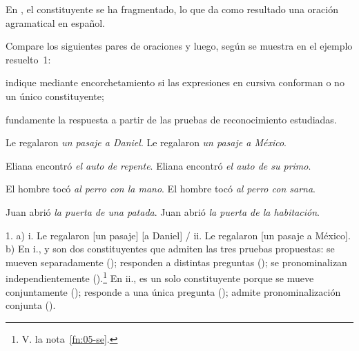 \begin{exe}
\end{exe}

En , el constituyente 
se ha fragmentado, lo que da como resultado una oración agramatical en español.

\begin{ejercicio}\label{ej:05-pares}
Compare los siguientes pares de oraciones y luego, según se muestra en el
ejemplo resuelto~1:

\begin{consignas}
  \item indique mediante encorchetamiento si las expresiones en cursiva
        conforman o no un único constituyente;
  \item fundamente la respuesta a partir de las pruebas de reconocimiento
        estudiadas.
\end{consignas}

\begin{exe}
  \ex
    \begin{xlist}
      \ex Le regalaron \textit{un pasaje a Daniel}.
      \ex Le regalaron \textit{un pasaje a México}.
    \end{xlist}
  \ex
    \begin{xlist}
      \ex Eliana encontró \textit{el auto de repente}.
      \ex Eliana encontró \textit{el auto de su primo}.
    \end{xlist}
  \ex
    \begin{xlist}
      \ex El hombre tocó \textit{al perro con la mano}.
      \ex El hombre tocó \textit{al perro con sarna}.
    \end{xlist}
  \ex
    \begin{xlist}
      \ex Juan abrió \textit{la puerta de una patada}.
      \ex Juan abrió \textit{la puerta de la habitación}.
    \end{xlist}
\end{exe}

\begin{resuelto}
1. a) i. Le regalaron [un pasaje] [a Daniel] / ii. Le regalaron [un pasaje a
México]. b) En i.,  y  son dos constituyentes
que admiten las tres pruebas propuestas: se mueven separadamente (); responden a distintas
preguntas ();
se pronominalizan independientemente ().\footnote{V. la nota~\ref{fn:05-se}.} En
ii.,  es un solo constituyente porque se mueve
conjuntamente (); responde a una única
pregunta (); admite pronominalización conjunta
().
\end{resuelto}
\end{ejercicio}

